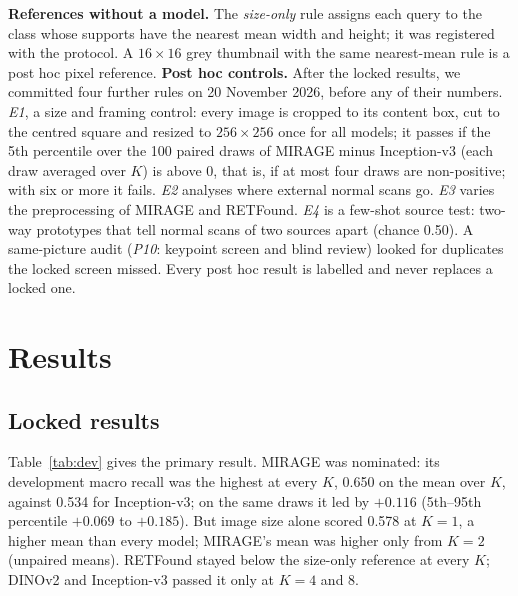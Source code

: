 \documentclass[conference]{IEEEtran}
\begin{document}
\textbf{References without a model.} The \emph{size-only} rule assigns each query to the class whose supports have the nearest mean width and height; it was registered with the protocol. A $16\times16$ grey thumbnail with the same nearest-mean rule is a post hoc pixel reference.
\textbf{Post hoc controls.} After the locked results, we committed four further rules on 20 November 2026, before any of their numbers. \emph{E1}, a size and framing control: every image is cropped to its content box, cut to the centred square and resized to $256\times256$ once for all models; it passes if the 5th percentile over the 100 paired draws of MIRAGE minus Inception-v3 (each draw averaged over $K$) is above 0, that is, if at most four draws are non-positive; with six or more it fails. \emph{E2} analyses where external normal scans go. \emph{E3} varies the preprocessing of MIRAGE and RETFound. \emph{E4} is a few-shot source test: two-way prototypes that tell normal scans of two sources apart (chance 0.50). A same-picture audit (\emph{P10}: keypoint screen and blind review) looked for duplicates the locked screen missed. Every post hoc result is labelled and never replaces a locked one.

\section{Results}
\subsection{Locked results}
Table~\ref{tab:dev} gives the primary result. MIRAGE was nominated: its development macro recall was the highest at every $K$, 0.650 on the mean over $K$, against 0.534 for Inception-v3; on the same draws it led by $+0.116$ (5th--95th percentile $+0.069$ to $+0.185$). But image size alone scored 0.578 at $K=1$, a higher mean than every model; MIRAGE's mean was higher only from $K=2$ (unpaired means). RETFound stayed below the size-only reference at every $K$; DINOv2 and Inception-v3 passed it only at $K=4$ and 8.
\end{document}
